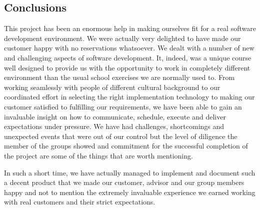 \subsection{Conclusions}
This project has been an enormous help in making ourselves fit for a real software development environment. We were actually very delighted to have made our customer happy with no reservations whatsoever. We dealt with a number of new and challenging aspects of software development. It, indeed, was a unique course well designed to provide us with the opportunity to work in completely different environment than the usual school exercises we are normally used to. From working seamlessly with people of different cultural background to our coordinated effort in selecting the right implementation technology to making our customer satisfied to fulfilling our requirements, we have been able to gain an invaluable insight on how to communicate, schedule, execute and deliver expectations under pressure. We have had challenges, shortcomings and unexpected events that were out of our control but the level of diligence the member of the groups showed and commitment for the successful completion of the project are some of the things that are worth mentioning.

In such a short time, we have actually managed to implement and document such a decent product that we made our customer, advisor and our group members happy and not to mention the extremely invaluable experience we earned working with real customers and their strict expectations. 